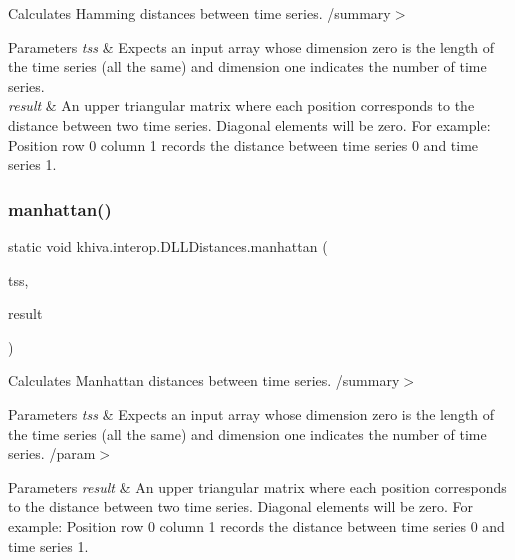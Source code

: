 Calculates Hamming distances between time series. /summary$>$ 
\begin{DoxyParams}{Parameters}
{\em tss} & Expects an input array whose dimension zero is the length of the time series (all the same) and dimension one indicates the number of time series.\\
\hline
{\em result} & An upper triangular matrix where each position corresponds to the distance between two time series. Diagonal elements will be zero. For example\+: Position row 0 column 1 records the distance between time series 0 and time series 1.\\
\hline
\end{DoxyParams}


\mbox{\label{classkhiva_1_1interop_1_1_d_l_l_distances_a739d40b582b68694ea71525d7092768f}} 
\subsubsection{\texorpdfstring{manhattan()}{manhattan()}}
{\footnotesize\ttfamily static void khiva.\+interop.\+D\+L\+L\+Distances.\+manhattan (\begin{DoxyParamCaption}\item[{\mbox{[}\+In\mbox{]} ref Int\+Ptr}]{tss,  }\item[{\mbox{[}\+Out\mbox{]} out Int\+Ptr}]{result }\end{DoxyParamCaption})\hspace{0.3cm}{\ttfamily [static]}}



Calculates Manhattan distances between time series. /summary$>$ 
\begin{DoxyParams}{Parameters}
{\em tss} & Expects an input array whose dimension zero is the length of the time series (all the same) and dimension one indicates the number of time series. /param$>$ 
\begin{DoxyParams}{Parameters}
{\em result} & An upper triangular matrix where each position corresponds to the distance between two time series. Diagonal elements will be zero. For example\+: Position row 0 column 1 records the distance between time series 0 and time series 1.\\
\hline
\end{DoxyParams}
\\
\hline
\end{DoxyParams}


